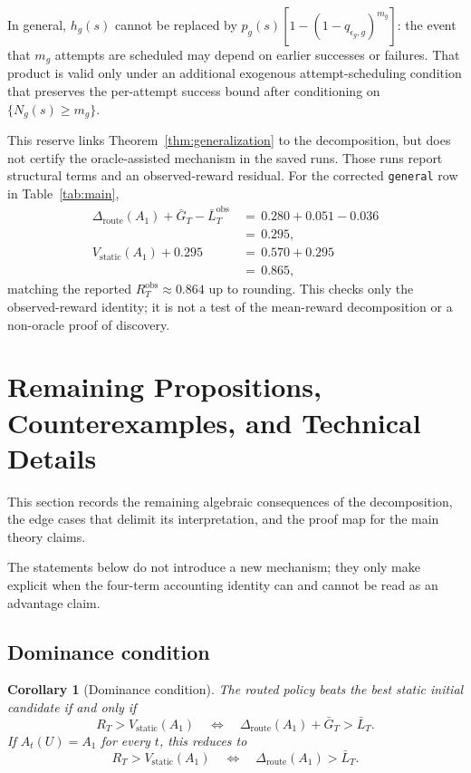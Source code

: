 \documentclass{article} %
\newtheorem{corollary}[theorem]{Corollary}
\begin{document}
In general, $h_g(s)$ cannot be replaced by
$p_g(s)[1-(1-q_{\epsilon_g,g})^{m_g}]$: the event that $m_g$ attempts are
scheduled may depend on earlier successes or failures. That product is valid
only under an additional exogenous attempt-scheduling condition that preserves
the per-attempt success bound after conditioning on $\{N_g(s)\ge m_g\}$.

This reserve links Theorem~\ref{thm:generalization} to the decomposition, but
does not certify the oracle-assisted mechanism in the saved runs.  Those runs
report structural terms and an observed-reward residual.  For the corrected
\texttt{general} row in Table~\ref{tab:main},
\begin{equation}
\begin{aligned}
\Delta_{\mathrm{route}}(A_1)
+
\bar G_T
-
\bar L_T^{\mathrm{obs}}
&\,=\,
0.280+0.051-0.036
\\
&\,=\,
0.295, \\
V_{\mathrm{static}}(A_1)
+
0.295
&\,=\,
0.570+0.295
\\
&\,=\,
0.865,
\end{aligned}
\end{equation}
matching the reported \(R_T^{\mathrm{obs}}\approx0.864\) up to rounding.  This
checks only the observed-reward identity; it is not a test of the mean-reward
decomposition or a non-oracle proof of discovery.

\section{Remaining Propositions, Counterexamples, and Technical Details}

\label{app:proofs4}

This section records the remaining algebraic consequences of the decomposition, the edge cases that delimit its interpretation, and the proof map for the main theory claims.

The statements below do not introduce a new mechanism; they only make explicit when the four-term accounting identity can and cannot be read as an advantage claim.

\subsection{Dominance condition}

\begin{corollary}[Dominance condition]
\label{cor:app-dominance}
The routed policy beats the best static initial candidate if and only if
\begin{equation}
R_T
>
V_{\mathrm{static}}(A_1)
\quad\Longleftrightarrow\quad
\Delta_{\mathrm{route}}(A_1)+\bar G_T>\bar L_T.
\end{equation}
If \(A_t(U)=A_1\) for every \(t\), this reduces to
\begin{equation}
R_T
>
V_{\mathrm{static}}(A_1)
\quad\Longleftrightarrow\quad
\Delta_{\mathrm{route}}(A_1)>\bar L_T.
\end{equation}
\end{corollary}
\end{document}
